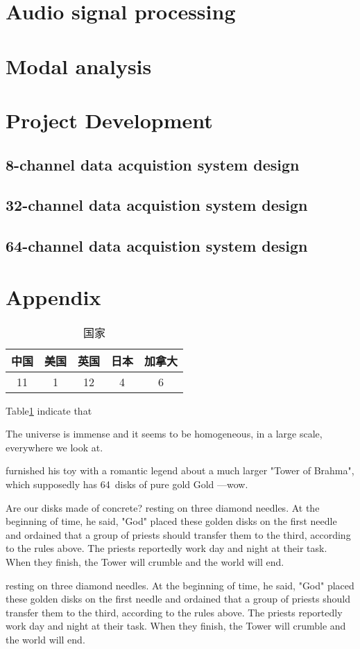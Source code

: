 \documentclass[UTF8]{book}
\begin{document}
	\part{Audio signal processing}
	
	\part{Modal analysis}
	
	\part{Project Development}
	\chapter{8-channel data acquistion system design}
	\chapter{32-channel data acquistion system design}
	\chapter{64-channel data acquistion system design}
	
	\part{Appendix}
	
	



\begin{table}[H]
	\centering
	\caption{国家}
	\begin{tabular}{|c|c|c|c|c|}
		\hline
		中国 &美国 &英国 &日本&加拿大\\
		\hline
		11&1&12&4&6\\
		\hline
	\end{tabular}
	\label{tab2}    
\end{table}

Table\ref{tab2} indicate that

The universe is immense and it seems to be homogeneous, 
in a large scale, everywhere we look at.

furnished his toy with a romantic legend about a much larger
"Tower of Brahma", which supposedly has 64~disks of pure gold
Gold ---wow.\par Are our disks made of concrete? 
resting on three diamond needles. At the beginning of time, he said,
"God" placed these golden disks on the first needle and ordained that a
group of priests should transfer them to the third, according to the
rules above. The priests reportedly work day and night at their task.
When they finish, the Tower will crumble and the world will end.

resting on three diamond needles. At the beginning of time, he said,
"God" placed these golden disks on the first needle and ordained that a
group of priests should transfer them to the third, according to the
rules above. The priests reportedly work day and night at their task.
When they finish, the Tower will crumble and the world will end.
\end{document}
